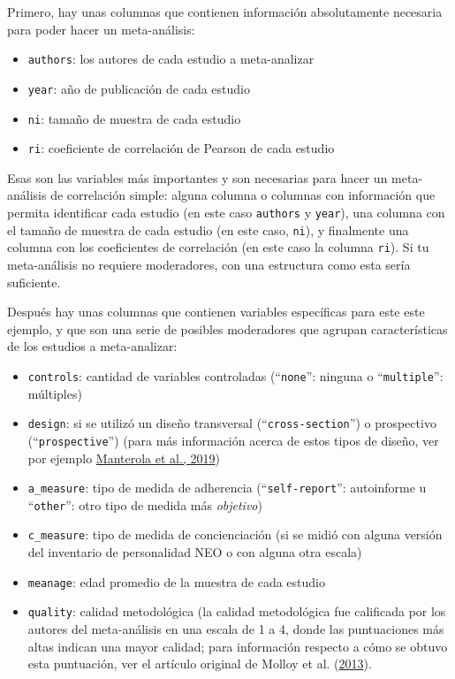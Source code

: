 \documentclass[
  bookmarksnumbered]{article}
\begin{document}
Primero, hay unas columnas que contienen información absolutamente necesaria para poder hacer un meta-análisis:

\begin{itemize}
\item
  \texttt{authors}: los autores de cada estudio a meta-analizar
\item
  \texttt{year}: año de publicación de cada estudio
\item
  \texttt{ni}: tamaño de muestra de cada estudio
\item
  \texttt{ri}: coeficiente de correlación de Pearson de cada estudio
\end{itemize}

Esas son las variables más importantes y son necesarias para hacer un meta-análisis de correlación simple: alguna columna o columnas con información que permita identificar cada estudio (en este caso \texttt{authors} y \texttt{year}), una columna con el tamaño de muestra de cada estudio (en este caso, \texttt{ni}), y finalmente una columna con los coeficientes de correlación (en este caso la columna \texttt{ri}). Si tu meta-análisis no requiere moderadores, con una estructura como esta sería suficiente.

Después hay unas columnas que contienen variables específicas para este este ejemplo, y que son una serie de posibles moderadores que agrupan características de los estudios a meta-analizar:

\begin{itemize}
\item
  \texttt{controls}: cantidad de variables controladas (``\texttt{none}'': ninguna o ``\texttt{multiple}'': múltiples)
\item
  \texttt{design}: si se utilizó un diseño transversal (``\texttt{cross-section}'') o prospectivo (``\texttt{prospective}'') (para más información acerca de estos tipos de diseño, ver por ejemplo \protect\hyperlink{ref-Manterola2019}{Manterola et al., 2019})
\item
  \texttt{a\_measure}: tipo de medida de adherencia (``\texttt{self-report}'': autoinforme u ``\texttt{other}'': otro tipo de medida más \emph{objetivo})
\item
  \texttt{c\_measure}: tipo de medida de concienciación (si se midió con alguna versión del inventario de personalidad NEO o con alguna otra escala)
\item
  \texttt{meanage}: edad promedio de la muestra de cada estudio
\item
  \texttt{quality}: calidad metodológica (la calidad metodológica fue calificada por los autores del meta-análisis en una escala de 1 a 4, donde las puntuaciones más altas indican una mayor calidad; para información respecto a cómo se obtuvo esta puntuación, ver el artículo original de Molloy et al. (\protect\hyperlink{ref-molloy2013}{2013}).
\end{itemize}
\end{document}
